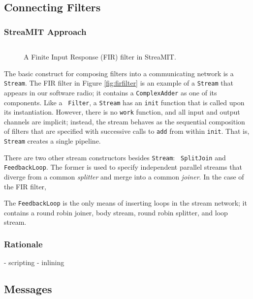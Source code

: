 \subsection{Connecting Filters}

\subsubsection{StreaMIT Approach}

\begin{figure}
\scriptsize
\begin{verbatim}

\end{verbatim}
\vspace{-12pt}
\caption{\protect\small A Finite Input Response (FIR) filter in StreaMIT.
\protect\label{fig:}}
\vspace{-12pt}
\end{figure}

The basic construct for composing filters into a communicating network
is a {\tt Stream}.  The FIR filter in Figure \ref{fig:firfilter} is an
example of a {\tt Stream} that appears in our software radio; it
contains a {\tt ComplexAdder} as one of its components.  Like a {\tt
Filter}, a {\tt Stream} has an {\tt init} function that is called upon
its instantiation.  However, there is no {\tt work} function, and all
input and output channels are implicit; instead, the stream behaves as
the sequential composition of filters that are specified with
successive calls to {\tt add} from within {\tt init}.  That is, {\tt
Stream} creates a single pipeline.

There are two other stream constructors besides {\tt Stream}: {\tt
SplitJoin} and {\tt FeedbackLoop}.  The former is used to specify
independent parallel streams that diverge from a common {\it splitter}
and merge into a common {\it joiner}.  In the case of the FIR filter, 

The {\tt FeedbackLoop} is the only means of inserting loops in the
stream network; it contains a round robin joiner, body stream, round
robin splitter, and loop stream.

\subsubsection{Rationale}

- scripting
- inlining

\subsection{Messages}

